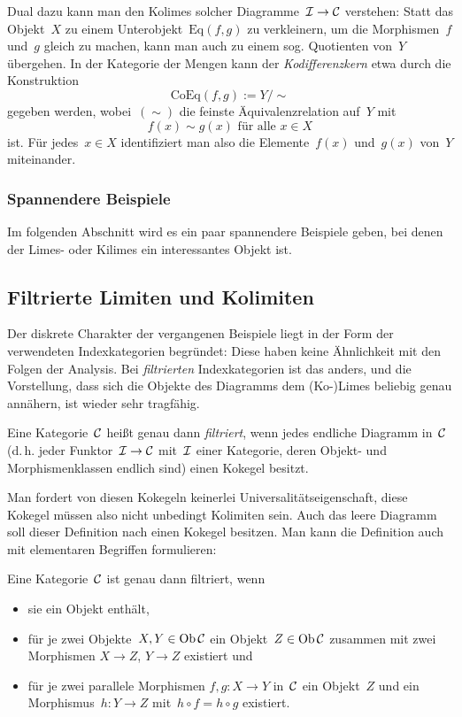 Dual dazu kann man den Kolimes solcher Diagramme~$\mathcal{I} \to \mathcal{C}$ verstehen: Statt
das Objekt~$X$ zu einem Unterobjekt~$\mathrm{Eq}(f,g)$ zu verkleinern, um die
Morphismen~$f$ und~$g$ gleich zu machen, kann man auch zu einem sog. Quotienten
von~$Y$ übergehen. In der Kategorie der Mengen kann der \emph{Kodifferenzkern}
etwa durch die Konstruktion
\[ \mathrm{CoEq}(f,g) := Y/{\sim} \]
gegeben werden, wobei~$({\sim})$ die feinste Äquivalenzrelation auf~$Y$ mit
\[ \text{$f(x) \sim g(x)$ für alle~$x \in X$} \]
ist. Für jedes~$x \in X$ identifiziert man also die Elemente~$f(x)$ und~$g(x)$
von~$Y$ miteinander.


\subsubsection*{Spannendere Beispiele}

Im folgenden Abschnitt wird es ein paar spannendere Beispiele geben, bei denen
der Limes- oder Kilimes ein interessantes Objekt ist.


\subsection{Filtrierte Limiten und Kolimiten}

Der diskrete Charakter der vergangenen Beispiele liegt in der Form der
verwendeten Indexkategorien begründet: Diese haben keine Ähnlichkeit mit den
Folgen der Analysis. Bei \emph{filtrierten} Indexkategorien ist das anders, und
die Vorstellung, dass sich die Objekte des Diagramms dem (Ko-)Limes beliebig
genau annähern, ist wieder sehr tragfähig.

\begin{defn}Eine Kategorie~$\mathcal{C}$ heißt genau dann \emph{filtriert}, wenn jedes
endliche Diagramm in~$\mathcal{C}$ (d.\,h. jeder Funktor~$\mathcal{I} \to \mathcal{C}$ mit~$\mathcal{I}$ einer
Kategorie, deren Objekt- und Morphismenklassen endlich sind) einen Kokegel
besitzt.\end{defn}
Man fordert von diesen Kokegeln keinerlei Universalitätseigenschaft, diese
Kokegel müssen also nicht unbedingt Kolimiten sein. Auch das leere Diagramm
soll dieser Definition nach einen Kokegel besitzen. Man kann die Definition
auch mit elementaren Begriffen formulieren:

\begin{prop}\label{charakterisierungfiltriert}%
Eine Kategorie~$\mathcal{C}$ ist genau dann filtriert, wenn
\begin{itemize}
\item sie ein Objekt enthält,
\item für je zwei Objekte~$X,Y\in\operatorname{Ob}\mathcal{C}$ ein Objekt~$Z\in\operatorname{Ob}\mathcal{C}$ zusammen mit
zwei Morphismen $X \to Z$, $Y \to Z$ existiert und
\item für je zwei parallele Morphismen $f, g : X \to Y$ in~$\mathcal{C}$ ein Objekt~$Z$
und ein Morphismus~$h : Y \to Z$ mit~$h \circ f = h \circ g$ existiert.
\end{itemize}
\end{prop}

